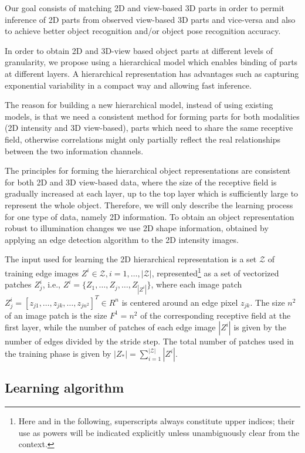 \documentclass[runningheads]{llncs}
\begin{document}
Our goal consists of matching 2D and view-based 3D parts in order to permit inference of 2D parts from observed view-based 3D parts and vice-versa and also to achieve better object recognition and/or object pose recognition accuracy.  

In order to obtain 2D and 3D-view based object parts at different levels of granularity, we propose using a hierarchical model which enables binding of parts at different layers. A hierarchical representation has advantages such as capturing exponential variability in a compact way and allowing fast inference.

The reason for building a new hierarchical model, instead of using existing models, is that we need a consistent method for forming parts for both modalities (2D intensity and 3D view-based), parts which need to share the same receptive field, otherwise correlations might only partially reflect the real relationships between the two information channels.

The principles for forming the hierarchical object representations are consistent for both 2D and 3D view-based data, where the size of the receptive field is gradually increased at each layer, up to the top layer which is sufficiently large to represent the whole object. Therefore, we will only describe the learning process for one type of data, namely 2D information. To obtain an object representation robust to illumination changes we use 2D shape information, obtained by applying an edge detection algorithm to the 2D intensity images.

The input used for learning the 2D hierarchical representation is a set $\mathcal{Z}$ of training edge images $Z^i \in \mathcal{Z}, i=1,\ldots,|\mathcal{Z}|$, represented\footnote{Here and in the following, superscripts always constitute upper indices; their use as powers will be indicated explicitly unless unambiguously clear from the context.} as a set of vectorized patches $Z_j^i$, i.e., $Z^i=\{Z_1,\ldots,Z_j,\ldots,Z_{|Z^i|}\}$, where each image patch
$Z_j^i=[z_{j1},\ldots,z_{jk},\ldots,z_{jn^2}]^T \in R^n$ is centered around an edge pixel $z_{jk}$. The size $n^2$ of an image patch is the size $F^1=n^2$ of the corresponding receptive field at the first layer, while the number of patches of each edge image $|Z^i|$ is given by the number of edges divided by the stride step. The total number of patches used in the training phase is given by $|Z_*|=\sum_{i=1}^{|\mathcal{Z}|} |Z^i|$.

\subsection{Learning algorithm} 
\end{document}
